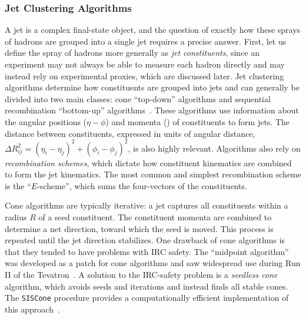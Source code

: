 \subsubsection{Jet Clustering Algorithms}
A jet is a complex final-state object, and the question of exactly how these sprays of hadrons are grouped into a single jet requires a precise answer.
First, let us define the spray of hadrons more generally as \textit{jet constituents}, since an experiment may not always be able to measure each hadron directly and may instead rely on experimental proxies, which are discussed later.
Jet clustering algorithms determine how constituents are grouped into jets and can generally be divided into two main classes: cone ``top-down'' algorithms and sequential recombination ``bottom-up'' algorithms~\cite{Jet:AlgoReview}.
These algorithms use information about the angular positions ($\eta-\phi$) and momenta (\PT) of constituents to form jets.
The distance between constituents, expressed in units of angular distance, $\Delta R_{ij}^2 = \left(\eta_i - \eta_j \right)^2+\left(\phi_i - \phi_j \right)^2$, is also highly relevant.
Algorithms also rely on \textit{recombination schemes}, which dictate how constituent kinematics are combined to form the jet kinematics.
The most common and simplest recombination scheme is the ``$E$-scheme'', which sums the four-vectors of the constituents.

Cone algorithms are typically iterative: a jet captures all constituents within a radius $R$ of a seed constituent.
The constituent momenta are combined to determine a net direction, toward which the seed is moved.
This process is repeated until the jet direction stabilizes.
One drawback of cone algorithms is that they tended to have problems with IRC safety. The ``midpoint algorithm'' was developed as a patch for cone algorithms and saw widespread use during Run II of the Tevatron~\cite{Jet:AlgoReview}.
A solution to the IRC-safety problem is a \textit{seedless cone} algorithm, which avoids seeds and iterations and instead finds all stable cones. The \texttt{SISCone} procedure provides a computationally efficient implementation of this approach~\cite{Jet:SISCone}.

